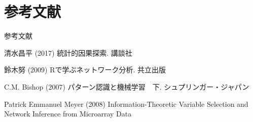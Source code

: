 \documentclass[dvipdfmx]{beamer}
\begin{document}
\section{参考文献}
\begin{frame}{参考文献}
\begin{description}
\setlength{\itemsep}{0.3cm}
{\scriptsize
\item[{[1]}]
清水昌平 (2017) 統計的因果探索. 講談社

\item[{[2]}]
鈴木努 (2009) Rで学ぶネットワーク分析. 共立出版

\item[{[3]}]
C.M. Bishop (2007) パターン認識と機械学習　下. シュプリンガー・ジャパン

\item[{[4]}]
Patrick Emmanuel Meyer (2008) Information-Theoretic Variable Selection and Network Inference from Microarray Data

}
\end{description}
\end{frame}
\end{document}
